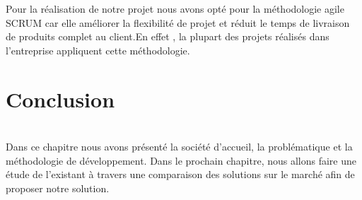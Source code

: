 \textsf{\selectfont{}
Pour la réalisation de notre projet nous avons opté pour la méthodologie agile SCRUM car elle
améliorer la flexibilité de projet et réduit le temps de livraison de produits complet au client.En
effet , la plupart des projets réalisés dans l’entreprise appliquent cette méthodologie.}\\[0.2cm]

\section{\LARGE    Conclusion}
\texttt{}\\[0.3cm]
\textsf{\selectfont{} Dans ce chapitre nous avons présenté la société d’accueil, la problématique et la méthodologie de développement.
    Dans le prochain chapitre, nous allons faire une étude de l’existant à travers une comparaison des solutions sur le marché afin de proposer notre solution. 
}






